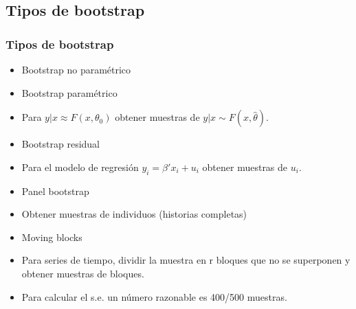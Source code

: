 \documentclass[t, compress, spanish, aspectratio=169]{beamer}
\begin{document}
\subsection{Tipos de bootstrap}
\begin{frame}
    \frametitle{Tipos de bootstrap}
    \begin{itemize} 
        \item <1-> \alert{Bootstrap no param\'etrico}
        \item <2-> \alert{Bootstrap param\'etrico}
        \item[] <2-> Para $y|x \approx F(x,\theta_0)$ obtener muestras de $y|x \sim F(x,\hat \theta)$.
        \item <3-> \alert{Bootstrap residual}
        \item[] <3-> Para el modelo de regresi\'on $y_i=\beta'x_i+u_i$ obtener muestras de $u_i$.
        \item <4-> \alert{Panel bootstrap}
        \item[] <4-> Obtener muestras de individuos (historias completas)
        \item <5-> \alert{Moving blocks}
        \item[] <5-> Para series de tiempo, dividir la muestra en r bloques que no se superponen y obtener muestras de bloques.
        \item <6-> Para calcular el s.e. un n\'umero razonable es 400/500 muestras.
    \end{itemize}
\end{frame}
\end{document}
